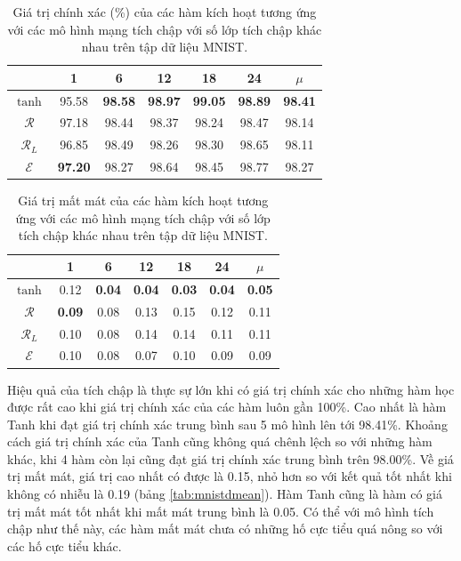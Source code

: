 \begin{table}[ht!]
\centering
\def\arraystretch{1.5}
\begin{tabular}{c|c|c|c|c|c|c|}
\cline{2-7}
                        & 1     & 6     & 12    & 18    & 24  & $\mu$  \\ \hline
\multicolumn{1}{|c|}{$\tanh$} & 95.58 & \textbf{98.58} & \textbf{98.97} & \textbf{99.05} & \textbf{98.89} & \textbf{98.41}\\ \hline
\multicolumn{1}{|c|}{$\mathcal{R}$} & 97.18 & 98.44 & 98.37 & 98.24 & 98.47 & 98.14\\ \hline
\multicolumn{1}{|c|}{$\mathcal{R}_L$} & 96.85 & 98.49 & 98.26 & 98.30 & 98.65 & 98.11\\ \hline
\multicolumn{1}{|c|}{$\mathcal{E}$} & \textbf{97.20} & 98.27 & 98.64 & 98.45 & 98.77 & 98.27\\ \hline
\end{tabular}
\caption{Giá trị chính xác (\%) của các hàm kích hoạt tương ứng với các mô hình mạng tích chập với số lớp tích chập khác nhau trên tập dữ liệu MNIST.}
\label{tab:mnistcnnacc}
\end{table}

\begin{table}[ht!]
\centering
\def\arraystretch{1.5}
\begin{tabular}{c|c|c|c|c|c|c|}
\cline{2-7}
                        & 1     & 6     & 12    & 18    & 24 & $\mu$   \\ \hline
\multicolumn{1}{|c|}{$\tanh$} & 0.12 & \textbf{0.04} & \textbf{0.04} & \textbf{0.03} & \textbf{0.04} & \textbf{0.05}\\ \hline
\multicolumn{1}{|c|}{$\mathcal{R}$} & \textbf{0.09} & 0.08 & 0.13 & 0.15 & 0.12 & 0.11\\ \hline
\multicolumn{1}{|c|}{$\mathcal{R}_L$} & 0.10 & 0.08 & 0.14 & 0.14 & 0.11 & 0.11\\ \hline
\multicolumn{1}{|c|}{$\mathcal{E}$} & 0.10 & 0.08 & 0.07 & 0.10 & 0.09 & 0.09\\ \hline
\end{tabular}
\caption{Giá trị mất mát của các hàm kích hoạt tương ứng với các mô hình mạng tích chập với số lớp tích chập khác nhau trên tập dữ liệu MNIST.}
\label{tab:mnistcnnloss}
\end{table}

Hiệu quả của tích chập là thực sự lớn khi có giá trị chính xác cho những hàm học được rất cao khi giá trị chính xác của các hàm luôn gần 100\%.
Cao nhất là hàm Tanh khi đạt giá trị chính xác trung bình sau 5 mô hình lên tới 98.41\%.
Khoảng cách giá trị chính xác của Tanh cũng không quá chênh lệch so với những hàm khác, khi 4 hàm còn lại cũng đạt giá trị chính xác trung bình trên 98.00\%.
Về giá trị mất mát, giá trị cao nhất có được là 0.15, nhỏ hơn so với kết quả tốt nhất khi không có nhiễu là 0.19 (bảng \ref{tab:mnistdmean}).
Hàm Tanh cũng là hàm có giá trị mất mát tốt nhất khi mất mát trung bình là 0.05.
Có thể với mô hình tích chập như thế này, các hàm mất mát chưa có những hố cực tiểu quá nông so với các hố cực tiểu khác.

